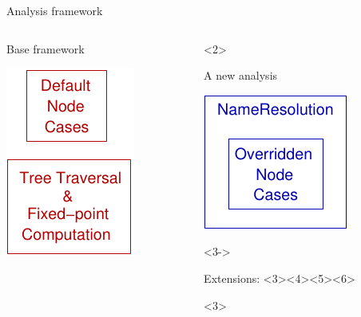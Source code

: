\begin{frame}[t]{Analysis framework}
  \begin{columns}[T]
    \begin{column}{4cm}
      \begin{block}{Base framework}
        \begin{center}
          \includegraphics{images/analysis_left.pdf}
        \end{center}
      \end{block}
    \end{column}
    \begin{column}{6cm}
      \begin{onlyenv}<2>
        \begin{block}{A new analysis}
          \begin{center}
            \includegraphics{images/analysis_right.pdf}
          \end{center}
        \end{block}
      \end{onlyenv}
      \begin{onlyenv}<3->
        \begin{block}{Extensions: 
            <3><4><5><6>
          }
          \begin{center}
            \begin{onlyenv}<3>

\end{onlyenv}
\end{center}
\end{block}
\end{onlyenv}
\end{column}
\end{columns}
\end{frame}
